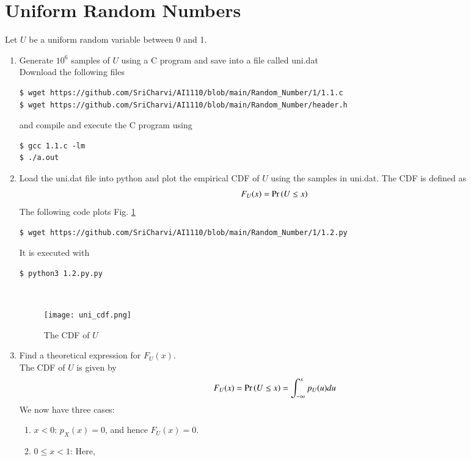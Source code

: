 \documentclass[journal,12pt,twocolumn]{IEEEtran}
\renewcommand\thesection{\arabic{section}}
\begin{document}
\section{Uniform Random Numbers}
Let $U$ be a uniform random variable between 0 and 1.
\begin{enumerate}[label=\thesection.\arabic*
,ref=\thesection.\theenumi]
\item Generate $10^6$ samples of $U$ using a C program and save into a file called uni.dat \\
\solution Download the following files
\begin{lstlisting}
$ wget https://github.com/SriCharvi/AI1110/blob/main/Random_Number/1/1.1.c
$ wget https://github.com/SriCharvi/AI1110/blob/main/Random_Number/header.h
\end{lstlisting}
and compile and execute the C program using
\begin{lstlisting}
$ gcc 1.1.c -lm
$ ./a.out
\end{lstlisting}
%
\item
Load the uni.dat file into python and plot the empirical CDF of $U$ using the samples in uni.dat. The CDF is defined as
\begin{align}
F_{U}(x) = \Pr\left(U \leq x\right)
\end{align}
\solution  The following code plots Fig. \ref{fig:uni_cdf}
\begin{lstlisting}
$ wget https://github.com/SriCharvi/AI1110/blob/main/Random_Number/1/1.2.py
\end{lstlisting}
It is executed with
\begin{lstlisting}
$ python3 1.2.py.py
\end{lstlisting}
\\
\begin{figure}
\centering
\texttt{[image: uni\_cdf.png]}
\caption{The CDF of $U$}
\label{fig:uni_cdf}
\end{figure}
%
\item
Find a theoretical expression for $F_{U}(x)$.\\
\solution
The CDF of $U$ is given by
		\begin{align}
			F_U(x) = \Pr\left(U \leq x\right) = \int_{-\infty}^{x}p_U(u)du
		\end{align}
We now have three cases:
		\begin{enumerate}
			\item $x < 0$: $p_X(x) = 0$, and hence $F_U(x) = 0$.
			\item $0 \leq x < 1$: Here,
				\begin{align}

\end{align}
\end{enumerate}
\end{enumerate}
\end{document}
